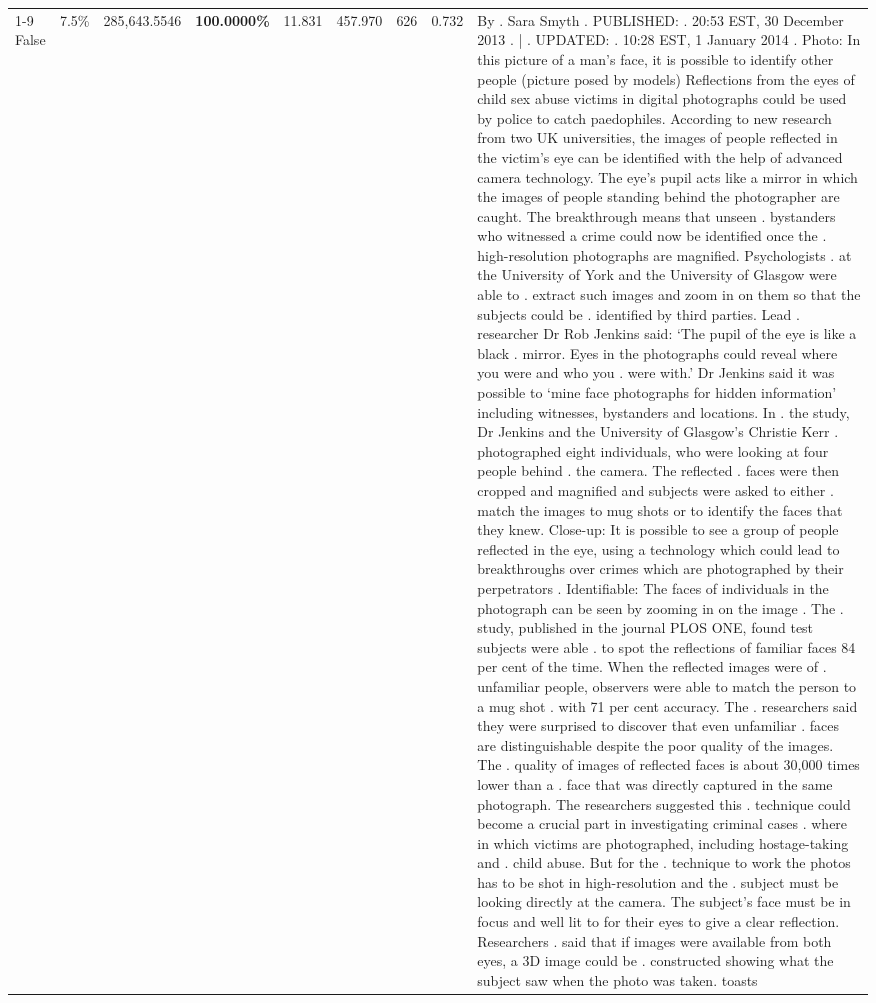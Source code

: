 \begin{table}[H]
\begin{tabular}{lllrlllll}
\cline{1-9}
False & 7.5\% & \color{red} 285,643.5546 & \bfseries \color{red} 100.0000\% & 11.831 & 457.970 & 626 & 0.732 & By . Sara Smyth . PUBLISHED: . 20:53 EST, 30 December 2013 . | . UPDATED: . 10:28 EST, 1 January 2014 . Photo: In this picture of a man's face, it is possible to identify other people (picture posed by models) Reflections from the eyes of child sex abuse victims in digital photographs could be used by police to catch paedophiles. According to new research from two UK universities, the images of people reflected in the victim's eye can be identified with the help of advanced camera technology. The eye's pupil acts like a mirror in which the images of people standing behind the photographer are caught. The breakthrough means that unseen . bystanders who witnessed a crime could now be identified once the . high-resolution photographs are magnified. Psychologists . at the University of York and the University of Glasgow were able to . extract such images and zoom in on them so that the subjects could be . identified by third parties. Lead . researcher Dr Rob Jenkins said: ‘The pupil of the eye is like a black . mirror. Eyes in the photographs could reveal where you were and who you . were with.' Dr Jenkins said it was possible to ‘mine face photographs for hidden information' including witnesses, bystanders and locations. In . the study, Dr Jenkins and the University of Glasgow's Christie Kerr . photographed eight individuals, who were looking at four people behind . the camera. The reflected . faces were then cropped and magnified and subjects were asked to either . match the images to mug shots or to identify the faces that they knew. Close-up: It is possible to see a group of people reflected in the eye, using a technology which could lead to breakthroughs over crimes which are photographed by their perpetrators . Identifiable: The faces of individuals in the photograph can be seen by zooming in on the image . The . study, published in the journal PLOS ONE, found test subjects were able . to spot the reflections of familiar faces 84 per cent of the time. When the reflected images were of . unfamiliar people, observers were able to match the person to a mug shot . with 71 per cent accuracy. The . researchers said they were surprised to discover that even unfamiliar . faces are distinguishable despite the poor quality of the images. The . quality of images of reflected faces is about 30,000 times lower than a . face that was directly captured in the same photograph. The researchers suggested this . technique could become a crucial part in investigating criminal cases . where in which victims are photographed, including hostage-taking and . child abuse. But for the . technique to work the photos has to be shot in high-resolution and the . subject must be looking directly at the camera. The subject's face must be in focus and well lit to for their eyes to give a clear reflection. Researchers . said that if images were available from both eyes, a 3D image could be . constructed showing what the subject saw when the photo was taken. toasts \\

\end{tabular}
\end{table}
